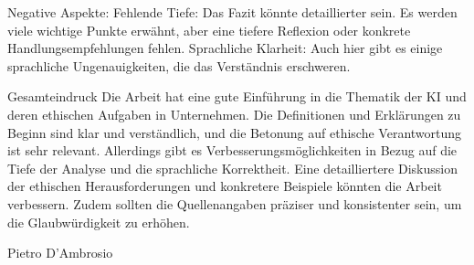 \documentclass{article}
\begin{document}
\begin{itemize}
Negative Aspekte:
Fehlende Tiefe: Das Fazit könnte detaillierter sein. Es werden viele wichtige Punkte erwähnt, aber eine tiefere Reflexion oder konkrete Handlungsempfehlungen fehlen.
Sprachliche Klarheit: Auch hier gibt es einige sprachliche Ungenauigkeiten, die das Verständnis erschweren.

Gesamteindruck
Die Arbeit hat eine gute Einführung in die Thematik der KI und deren ethischen Aufgaben in Unternehmen. Die Definitionen und Erklärungen zu Beginn sind klar und verständlich, und die Betonung auf ethische Verantwortung ist sehr relevant. Allerdings gibt es Verbesserungsmöglichkeiten in Bezug auf die Tiefe der Analyse und die sprachliche Korrektheit. Eine detailliertere Diskussion der ethischen Herausforderungen und konkretere Beispiele könnten die Arbeit verbessern. Zudem sollten die Quellenangaben präziser und konsistenter sein, um die Glaubwürdigkeit zu erhöhen.

Pietro D’Ambrosio
\end{itemize}





\printbibliography
\end{document}
